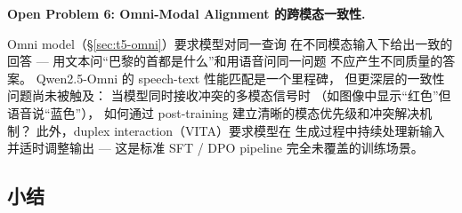 \begin{openproblembox}
\textbf{Open Problem 6: Omni-Modal Alignment 的跨模态一致性.}

Omni model（\S\ref{sec:t5-omni}）要求模型对同一查询
在不同模态输入下给出一致的回答 ---
用文本问``巴黎的首都是什么''和用语音问同一问题
不应产生不同质量的答案。
Qwen2.5-Omni 的 speech-text 性能匹配是一个里程碑，
但更深层的一致性问题尚未被触及：
当模型同时接收冲突的多模态信号时
（如图像中显示``红色''但语音说``蓝色''），
如何通过 post-training 建立清晰的模态优先级和冲突解决机制？
此外，duplex interaction（VITA）要求模型在
生成过程中持续处理新输入并适时调整输出 ---
这是标准 SFT / DPO pipeline 完全未覆盖的训练场景。
\end{openproblembox}

\subsection{小结}

